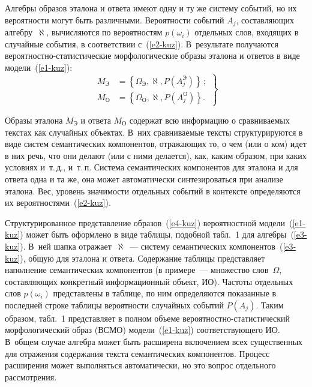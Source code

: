 \begin{multicols}{2}
Алгебры образов эталона и ответа имеют одну и ту же систему событий, но их 
вероятности могут быть различными. Вероятности событий $A_j$, со\-став\-ля\-ющих 
алгебру~$\aleph$, вычисляются по вероятностям $p(\omega_i)$ отдельных слов, 
входящих в случайные события, в соответствии с~(\ref{e2-kuz}). В~результате 
получаются ве\-ро\-ят\-ност\-но-ста\-ти\-сти\-че\-ские морфологические образы 
эталона и ответов в виде модели~(\ref{e1-kuz}): 
\begin{equation}
\left.
\begin{array}{rl}
M_{\mathrm{Э}}&=\left\{ \Omega_{\mathrm{Э}},\aleph, 
P(A_j^{\mathrm{Э}})\right\}\,;\\[6pt]
M_{\mathrm{О}} &=\left\{ \Omega_{\mathrm{О}},\aleph, 
P(A_j^{\mathrm{О}})\right\}.
\end{array}
\right\}
\label{e4-kuz}
\end{equation}
     
     Образы эталона $ M_{\mathrm{Э}}$ и ответа $ M_{\mathrm{О}}$ содержат 
всю информацию о сравниваемых текстах как случайных объектах. В~них 
сравниваемые тексты структурируются в виде систем семантических компонентов, 
отражающих то, о чем (или о ком) идет в них речь, что они делают (или с ними 
делается), как, каким образом, при каких условиях и~т.\,д., и~т.\,п. Система 
семантических компонентов для эталона и для ответа одна и та же, она может 
автоматически синтезироваться при анализе эталона. Вес, уровень значимости 
отдельных событий в контексте определяются их вероятностями~(\ref{e2-kuz}). 
     
     Структурированное представление образов~(\ref{e4-kuz}) вероятностной 
модели~(\ref{e1-kuz}) может быть оформлено в виде таблицы, подобной табл.~1 для 
алгебры~(\ref{e3-kuz}). В~ней шапка отражает~$\aleph$~--- систему семантических 
компонентов~(\ref{e3-kuz}), общую для эталона и ответа. Содержание таблицы 
представляет наполнение семантических компонентов (в примере~--- множество 
слов~$\Omega$, составляющих конкретный информационный объект, ИО). Частоты 
отдельных слов $p(\omega_i)$ представлены в таблице, по ним определяются 
показанные в последней строке таблицы вероятности случайных событий $P(A_j)$. 
Таким образом, табл.~1 представляет в полном объеме 
     ве\-ро\-ят\-ност\-но-ста\-ти\-сти\-че\-ский морфологический образ (ВСМО) 
модели~(\ref{e1-kuz}) соответствующего ИО. В~общем случае алгебра может быть 
расширена включением всех существенных для отражения содержания текста 
семантических компонентов. Процесс расширения может выполняться 
автоматически, но это вопрос отдельного рассмотрения. 


\end{multicols}
